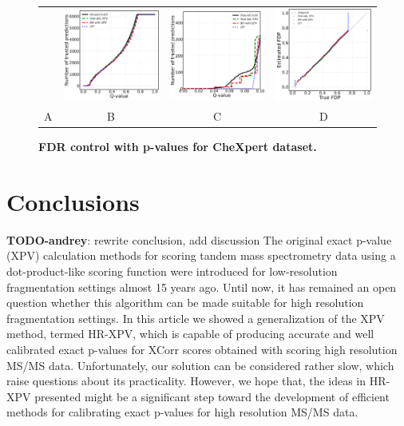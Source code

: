 \documentclass{article}
\newcommand{\todo}[2]{{\color{red} {\bf TODO-#1}: #2}}
\begin{document}
\begin{figure}
	\centering
	\begin{tabular}{cccc}
 		&
		\includegraphics[width=1.7in]{img/cnn_chx_fdr_control.png} & 
            \includegraphics[width=1.7in]{img/cnn_chx_fdr_control_loc.png} & 
            \includegraphics[width=1.7in]{img/cnn_FDPscat_chx.png}
		\\	
		A & B & C & D
	\end{tabular}
	\caption{\bf FDR control with p-values for CheXpert dataset.}
	\label{fig:chexpert}
\end{figure}


\section{Conclusions}
\todo{andrey}{rewrite conclusion, add discussion}
The original exact p-value (XPV) calculation methods for scoring tandem mass spectrometry data using a dot-product-like scoring function were introduced for low-resolution fragmentation settings almost 15 years ago. Until now, it has remained an open question whether this algorithm can be made suitable for high resolution fragmentation settings. In this article we showed a generalization of the XPV method, termed HR-XPV, which is capable of producing accurate and well calibrated exact p-values for XCorr scores obtained with scoring high resolution MS/MS data. Unfortunately, our solution can be considered rather slow, which raise questions about its practicality. However, we hope that, the ideas in HR-XPV presented might be a significant step toward the development of efficient methods for calibrating exact p-values for high resolution MS/MS data. 
\end{document}
